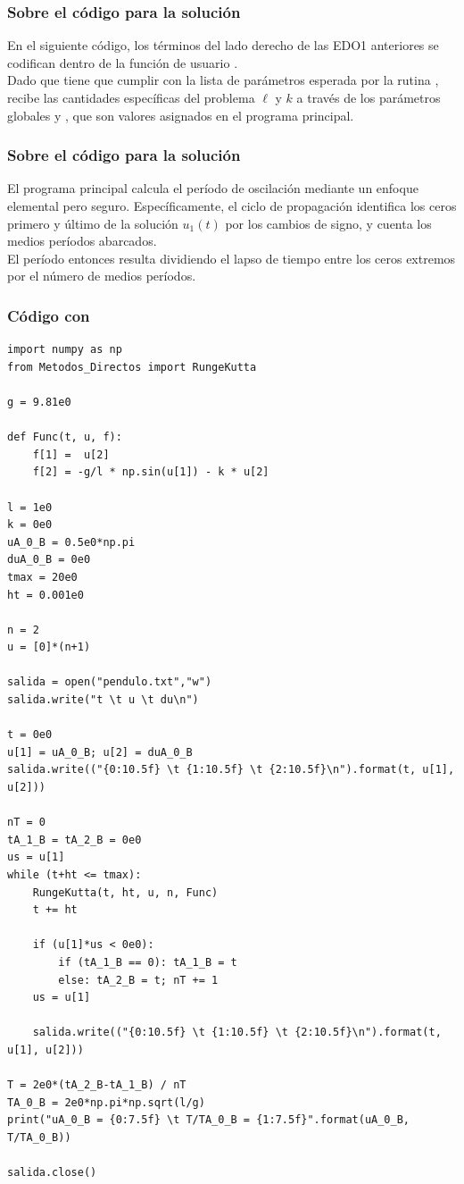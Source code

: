 \begin{frame}
\frametitle{Sobre el código para la solución}
En el siguiente código, los términos del lado derecho de las EDO1 anteriores se codifican dentro de la función de usuario .
\\
\bigskip
Dado que  tiene que cumplir con la lista de parámetros esperada por la rutina , recibe las cantidades específicas del problema $\ell$ y $k$ a través de los parámetros globales  y , que son valores asignados en el programa principal.
\end{frame}
\begin{frame}
\frametitle{Sobre el código para la solución}
El programa principal calcula el período de oscilación mediante un enfoque elemental pero seguro. Específicamente, el ciclo de propagación identifica los ceros primero y último de la solución $u_{1} (t)$ por los cambios de signo, y cuenta los medios períodos abarcados.
\\
\bigskip
El período entonces resulta dividiendo el lapso de tiempo entre los ceros extremos por el número de medios períodos.
\end{frame}
\begin{frame}
\frametitle{Código con \python}
\begin{lstlisting}[caption=Código para el problema del péndulo no lineal, style=codigopython]
import numpy as np
from Metodos_Directos import RungeKutta

g = 9.81e0

def Func(t, u, f):
    f[1] =  u[2]
    f[2] = -g/l * np.sin(u[1]) - k * u[2]

l = 1e0
k = 0e0
uA_0_B = 0.5e0*np.pi
duA_0_B = 0e0
tmax = 20e0
ht = 0.001e0

n = 2
u = [0]*(n+1)

salida = open("pendulo.txt","w")
salida.write("t \t u \t du\n")

t = 0e0
u[1] = uA_0_B; u[2] = duA_0_B
salida.write(("{0:10.5f} \t {1:10.5f} \t {2:10.5f}\n").format(t, u[1], u[2]))

nT = 0
tA_1_B = tA_2_B = 0e0
us = u[1]
while (t+ht <= tmax):
    RungeKutta(t, ht, u, n, Func)
    t += ht

    if (u[1]*us < 0e0):
        if (tA_1_B == 0): tA_1_B = t
        else: tA_2_B = t; nT += 1
    us = u[1]

    salida.write(("{0:10.5f} \t {1:10.5f} \t {2:10.5f}\n").format(t, u[1], u[2]))

T = 2e0*(tA_2_B-tA_1_B) / nT
TA_0_B = 2e0*np.pi*np.sqrt(l/g)
print("uA_0_B = {0:7.5f} \t T/TA_0_B = {1:7.5f}".format(uA_0_B, T/TA_0_B))

salida.close()
\end{lstlisting}
\end{frame}
